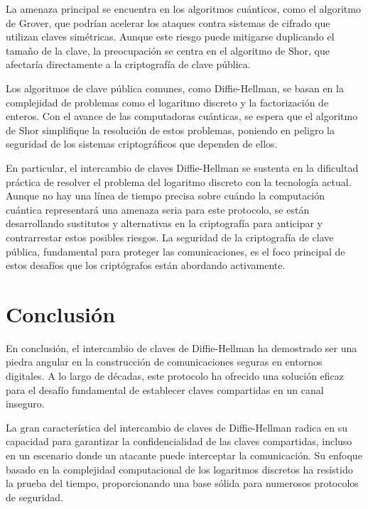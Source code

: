 \documentclass[11pt]{article}
\begin{document}
La amenaza principal se encuentra en los algoritmos cuánticos, como el algoritmo de Grover, que podrían acelerar los ataques contra sistemas de cifrado que utilizan claves simétricas. Aunque este riesgo puede mitigarse duplicando el tamaño de la clave, la preocupación se centra en el algoritmo de Shor, que afectaría directamente a la criptografía de clave pública.

\newpage

Los algoritmos de clave pública comunes, como Diffie-Hellman, se basan en la complejidad de problemas como el logaritmo discreto y la factorización de enteros. Con el avance de las computadoras cuánticas, se espera que el algoritmo de Shor simplifique la resolución de estos problemas, poniendo en peligro la seguridad de los sistemas criptográficos que dependen de ellos.

En particular, el intercambio de claves Diffie-Hellman se sustenta en la dificultad práctica de resolver el problema del logaritmo discreto con la tecnología actual. Aunque no hay una línea de tiempo precisa sobre cuándo la computación cuántica representará una amenaza seria para este protocolo, se están desarrollando sustitutos y alternativas en la criptografía para anticipar y contrarrestar estos posibles riesgos. La seguridad de la criptografía de clave pública, fundamental para proteger las comunicaciones, es el foco principal de estos desafíos que los criptógrafos están abordando activamente.


\section{Conclusión}
En conclusión, el intercambio de claves de Diffie-Hellman ha demostrado ser una piedra angular en la construcción de comunicaciones seguras en entornos digitales. A lo largo de décadas, este protocolo ha ofrecido una solución eficaz para el desafío fundamental de establecer claves compartidas en un canal inseguro.

La gran característica del intercambio de claves de Diffie-Hellman radica en su capacidad para garantizar la confidencialidad de las claves compartidas, incluso en un escenario donde un atacante puede interceptar la comunicación. Su enfoque basado en la complejidad computacional de los logaritmos discretos ha resistido la prueba del tiempo, proporcionando una base sólida para numerosos protocolos de seguridad.
\end{document}
